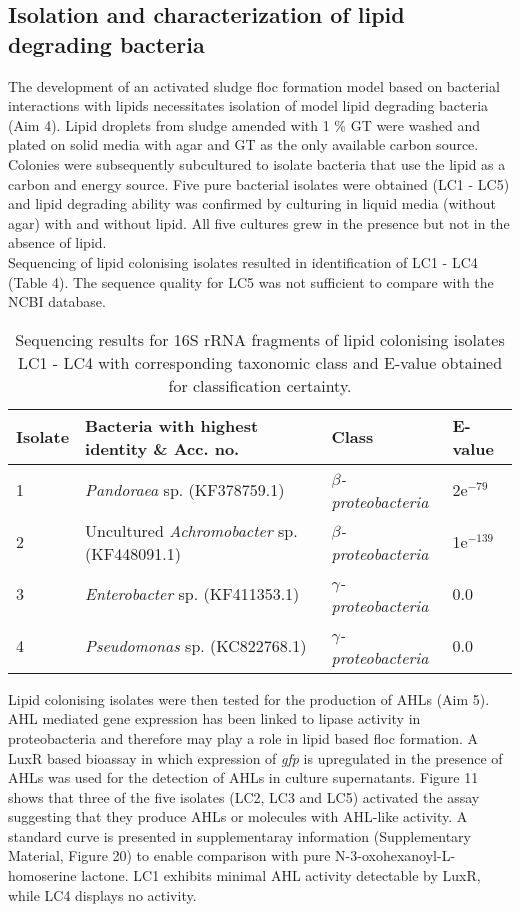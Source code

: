 \documentclass[twoside]{article}
\begin{document}
\subsection{Isolation and characterization of lipid degrading bacteria}

The development of an activated sludge floc formation model based on bacterial interactions with lipids necessitates isolation of model lipid degrading bacteria (Aim 4). Lipid droplets from sludge amended with 1 \% GT were washed and plated on solid media with agar and GT as the only available carbon source. Colonies were subsequently subcultured to isolate bacteria that use the lipid as a carbon and energy source. Five pure bacterial isolates were obtained (LC1 - LC5) and lipid degrading ability was confirmed by culturing in liquid media (without agar) with and without lipid. All five cultures grew in the presence but not in the absence of lipid. \\

Sequencing of lipid colonising isolates resulted in identification of LC1 - LC4 (Table 4). The sequence quality for LC5 was not sufficient to compare with the NCBI database.

\begin{table}
\caption{Sequencing results for 16S rRNA fragments of lipid colonising isolates LC1 - LC4 with corresponding taxonomic class and E-value obtained for classification certainty.}
\begin{tabular}{ | l | p{7.8cm} | p{3cm} | l | }
\hline
Isolate & Bacteria with highest identity \& Acc. no. & Class & E-value \\
\hline
1 &  \emph{Pandoraea} sp. (KF378759.1) & \emph{$\beta$-proteobacteria} & 2e$^{-79}$ \\
\hline
2 & Uncultured \emph{Achromobacter} sp. (KF448091.1) & \emph{$\beta$-proteobacteria} & 1e$^{-139}$ \\
\hline
3 & \emph{Enterobacter} sp. (KF411353.1) & \emph{$\gamma$-proteobacteria} & 0.0 \\
\hline
4 & \emph{Pseudomonas} sp. (KC822768.1) & \emph{$\gamma$-proteobacteria} & 0.0 \\
\hline
\end{tabular}
\end{table}

\FloatBarrier

Lipid colonising isolates were then tested for the production of AHLs (Aim 5). AHL mediated gene expression has been linked to lipase activity in proteobacteria and therefore may play a role in lipid based floc formation. A LuxR based bioassay in which expression of \emph{gfp} is upregulated in the presence of AHLs was used for the detection of AHLs in culture supernatants. Figure 11 shows that three of the five isolates (LC2, LC3 and LC5) activated the assay suggesting that they produce AHLs or molecules with AHL-like activity. A standard curve is presented in supplementaray information (Supplementary Material, Figure 20) to enable comparison with pure N-3-oxohexanoyl-L-homoserine lactone. LC1 exhibits minimal AHL activity detectable by LuxR, while LC4 displays no activity.\\
\end{document}
